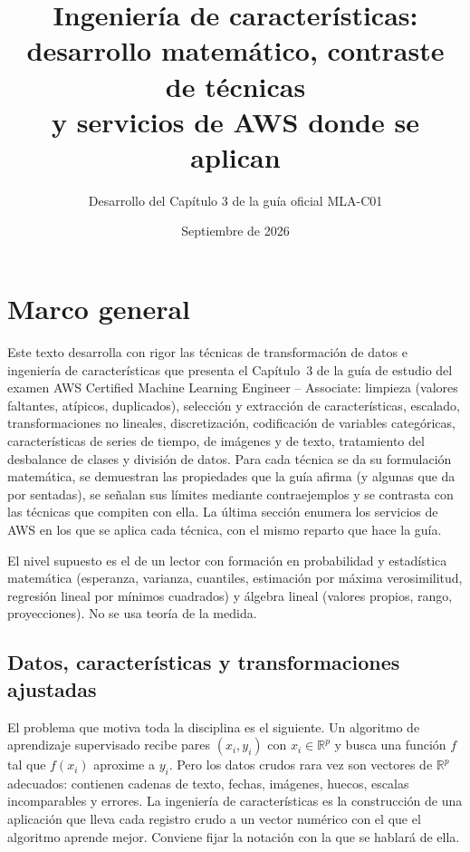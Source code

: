 \documentclass[11pt]{article}
\title{Ingeniería de características:\\ desarrollo matemático, contraste de técnicas\\ y servicios de AWS donde se aplican}
\author{Desarrollo del Capítulo 3 de la guía oficial MLA-C01}
\date{Septiembre de 2026}
\theoremstyle{definition}
\theoremstyle{remark}
\newcommand{\R}{\mathbb{R}}
\begin{document}
\maketitle
\tableofcontents

\section{Marco general}\label{sec:marco}

\noindent Este texto desarrolla con rigor las técnicas de transformación de datos e ingeniería de características que presenta el Capítulo~3 de la guía de estudio del examen AWS Certified Machine Learning Engineer -- Associate: limpieza (valores faltantes, atípicos, duplicados), selección y extracción de características, escalado, transformaciones no lineales, discretización, codificación de variables categóricas, características de series de tiempo, de imágenes y de texto, tratamiento del desbalance de clases y división de datos. Para cada técnica se da su formulación matemática, se demuestran las propiedades que la guía afirma (y algunas que da por sentadas), se señalan sus límites mediante contraejemplos y se contrasta con las técnicas que compiten con ella. La última sección enumera los servicios de AWS en los que se aplica cada técnica, con el mismo reparto que hace la guía.

\medskip

\noindent El nivel supuesto es el de un lector con formación en probabilidad y estadística matemática (esperanza, varianza, cuantiles, estimación por máxima verosimilitud, regresión lineal por mínimos cuadrados) y álgebra lineal (valores propios, rango, proyecciones). No se usa teoría de la medida.

\subsection{Datos, características y transformaciones ajustadas}

\noindent El problema que motiva toda la disciplina es el siguiente. Un algoritmo de aprendizaje supervisado recibe pares $(x_i,y_i)$ con $x_i\in\R^p$ y busca una función $f$ tal que $f(x_i)$ aproxime a $y_i$. Pero los datos crudos rara vez son vectores de $\R^p$ adecuados: contienen cadenas de texto, fechas, imágenes, huecos, escalas incomparables y errores. La ingeniería de características es la construcción de una aplicación que lleva cada registro crudo a un vector numérico con el que el algoritmo aprende mejor. Conviene fijar la notación con la que se hablará de ella.
\end{document}
